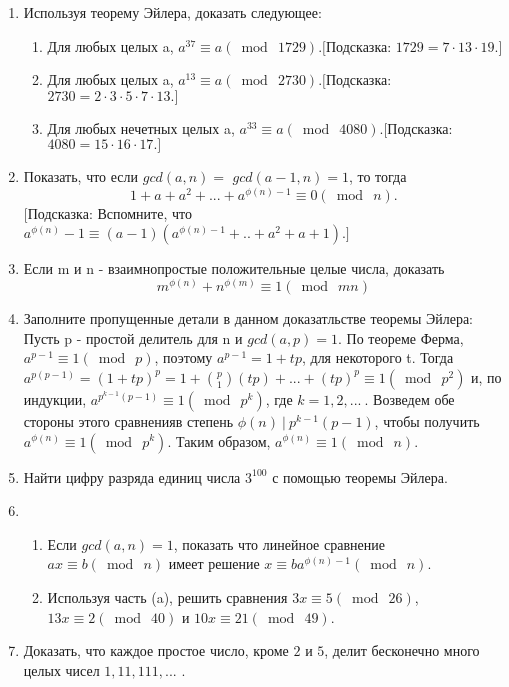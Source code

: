 \documentclass[11pt, leqno]{article}
\begin{document}
\begin{enumerate}
	\item Используя теорему Эйлера, доказать следующее:
		\begin{enumerate}
			\item Для любых целых a, $a^{37} \equiv a (\bmod\ 1729). [$Подсказка: $1729 = 7 \cdot 13 \cdot 19.]$
			\item Для любых целых a, $a^{13} \equiv a (\bmod\ 2730). [$Подсказка: $2730 = 2 \cdot 3 \cdot 5 \cdot 7 \cdot 13.]$
			\item Для любых нечетных целых a, $a^{33} \equiv a (\bmod\ 4080). [$Подсказка: $4080 = 15 \cdot 16 \cdot 17.]$
		\end{enumerate}
	\item Показать, что если $gcd(a, n) =$ $gcd(a-1, n) = 1$, то тогда
	\[1 + a + a^2 + ... + a^{\phi(n)-1}  \equiv 0 (\bmod\ n).\]
	$[$Подсказка: Вспомните, что $a^{\phi(n)} - 1 \equiv (a - 1)(a^{\phi(n) - 1} + .. + a^2 + a + 1). ]$
	\item Если m и n - взаимнопростые положительные целые числа, доказать
	\[m^{\phi(n)} + n^{\phi(m)} \equiv 1 (\bmod\ mn)\]
	\item Заполните пропущенные детали в данном доказатльстве теоремы Эйлера: Пусть p - простой делитель для n и $gcd(a, p) = 1$. По теореме Ферма, $a^{p - 1} \equiv 1 (\bmod\ p)$, поэтому $a^{p - 1} = 1 + tp$, для некоторого t. Тогда $a^{p(p - 1)} = (1 + tp)^p = 1 + \binom{p}{1} (tp) + ... + (tp)^p \equiv 1 (\bmod\ p^2)$ и, по индукции, $a^{p^{k - 1}(p - 1)} \equiv 1 (\bmod\ p^k)$, где $k = 1, 2, ...\ .$ Возведем обе стороны этого сравненияв степень $\phi(n)\ |\ p^{k - 1}(p - 1)$, чтобы получить $a^{\phi(n)} \equiv 1 (\bmod\ p^k)$. Таким образом, $a^{\phi(n)} \equiv 1 (\bmod\ n)$.
	\item Найти цифру разряда единиц числа $3^{100}$ с помощью теоремы Эйлера.
	\item 	\begin{enumerate}
			\item Если $gcd(a, n) = 1$, показать что линейное сравнение $ax \equiv b (\bmod\ n)$ имеет решение $x \equiv  ba^{\phi(n) - 1} (\bmod\ n)$.
			\item Используя часть (a), решить сравнения $3x \equiv 5 (\bmod\ 26)$, $13x \equiv 2 (\bmod\ 40)$ и $10x \equiv 21 (\bmod\ 49)$.
			\end{enumerate}
	\item Доказать, что каждое простое число, кроме $2$ и $5$, делит бесконечно много целых чисел $1, 11, 111, ...$ .
\end{enumerate}
\end{document}
